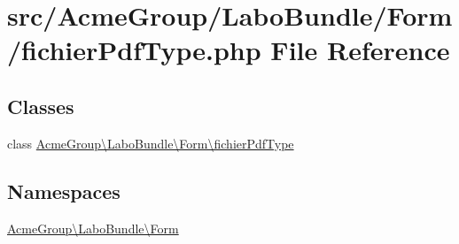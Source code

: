 \hypertarget{fichier_pdf_type_8php}{\section{src/\+Acme\+Group/\+Labo\+Bundle/\+Form/fichier\+Pdf\+Type.php File Reference}
\label{fichier_pdf_type_8php}
}
\subsection*{Classes}
\begin{DoxyCompactItemize}
\item 
class \hyperlink{class_acme_group_1_1_labo_bundle_1_1_form_1_1fichier_pdf_type}{Acme\+Group\textbackslash{}\+Labo\+Bundle\textbackslash{}\+Form\textbackslash{}fichier\+Pdf\+Type}
\end{DoxyCompactItemize}
\subsection*{Namespaces}
\begin{DoxyCompactItemize}
\item 
 \hyperlink{namespace_acme_group_1_1_labo_bundle_1_1_form}{Acme\+Group\textbackslash{}\+Labo\+Bundle\textbackslash{}\+Form}
\end{DoxyCompactItemize}
